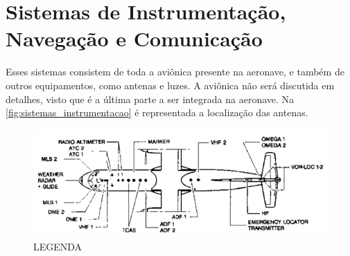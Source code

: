 \section{Sistemas de Instrumentação, Navegação e Comunicação}

Esses sistemas consistem de toda a aviônica presente na aeronave, e também de outros equipamentos, como antenas e luzes.
A aviônica não será discutida em detalhes, visto que é a última parte a ser integrada na aeronave.
Na \autoref{fig:sistemas_instrumentacao} é representada a localização das antenas.

\begin{figure}
\includegraphics[width=\textwidth]{images/parte3/sistemas_instrumentacao.png}
\caption{LEGENDA}
\label{fig:sistemas_instrumentacao}
\end{figure}

